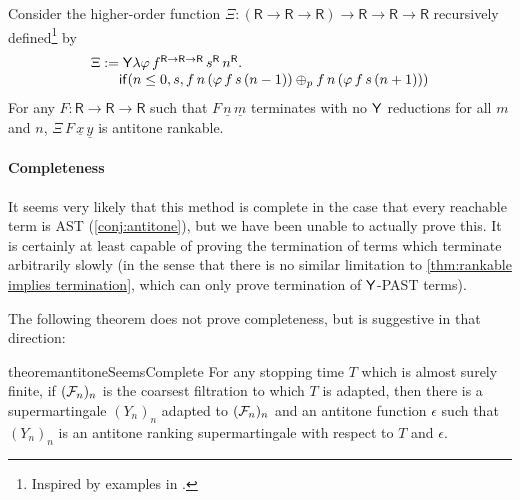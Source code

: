 \begin{example} \label{ex:higher-order recursion}
Consider the higher-order function
$\Xi : (\textsf{R} \to \textsf{R} \to \textsf{R}) \to \textsf{R} \to \textsf{R} \to \textsf{R}$
recursively defined\footnote{Inspired by examples in \cite{DBLP:journals/pacmpl/BurnOR18,DBLP:conf/lics/OngW19}.} by
\[
\begin{array}{l}
\Xi := \mathsf{Y} \lambda \varphi \, f^{\textsf{R} \to \textsf{R} \to \textsf{R}} \, s^\textsf{R} \, n^\textsf{R} . \\
\qquad\mathsf{if}(n \leq 0, s, 
f \, n \, (\varphi \, f \, s \, (n - 1))
\oplus_p
f \, n \, (\varphi \, f \, s \, (n + 1))
)
\end{array}
\]
For any $F : \textsf{R} \to \textsf{R} \to \textsf{R}$ such that $F\, \underline n\, \underline m$ terminates with no $\mathsf{Y}$ reductions for all $m$ and $n$, $\Xi\, F\, \underline x\, \underline y$ is antitone rankable.
\end{example}

\paragraph*{Completeness}
It seems very likely that this method is complete in the case that every reachable term is AST (\cref{conj:antitone}), but we have been unable to actually prove this. It is certainly at least capable of proving the termination of terms which terminate arbitrarily slowly (in the sense that there is no similar limitation to \cref{thm:rankable implies termination}, which can only prove termination of $\mathsf{Y}$-PAST terms).

The following theorem does not prove completeness, but is suggestive in that direction:
\begin{restatable}{theorem}{antitoneSeemsComplete}
For any stopping time $T$ which is almost surely finite, if $(\mathcal{F}_n)_n$ is the coarsest filtration to which $T$ is adapted, then there is a supermartingale $(Y_n)_n$ adapted to $(\mathcal{F}_n)_n$ and an antitone function $\epsilon$ such that $(Y_n)_n$ is an antitone ranking supermartingale with respect to $T$ and $\epsilon$.
\end{restatable}
